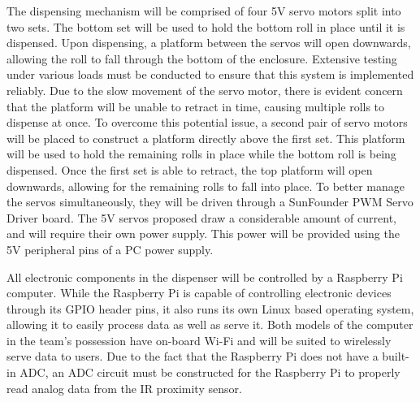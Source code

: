 \par The dispensing mechanism will be comprised of four 5V servo motors split into two sets. The bottom set will be used to hold the bottom roll in place until it is dispensed. Upon dispensing, a platform between the servos will open downwards, allowing the roll to fall through the bottom of the enclosure. Extensive testing under various loads must be conducted to ensure that this system is implemented reliably. Due to the slow movement of the servo motor, there is evident concern that the platform will be unable to retract in time, causing multiple rolls to dispense at once. To overcome this potential issue, a second pair of servo motors will be placed to construct a platform directly above the first set. This platform will be used to hold the remaining rolls in place while the bottom roll is being dispensed. Once the first set is able to retract, the top platform will open downwards, allowing for the remaining rolls to fall into place. To better manage the servos simultaneously, they will be driven through a SunFounder PWM Servo Driver board. The 5V servos proposed draw a considerable amount of current, and will require their own power supply. This power will be provided using the 5V peripheral pins of a PC power supply. 

\par All electronic components in the dispenser will be controlled by a Raspberry Pi computer. While the Raspberry Pi is capable of controlling electronic devices through its GPIO header pins, it also runs its own Linux based operating system, allowing it to easily process data as well as serve it. Both models of the computer in the team's possession have on-board Wi-Fi and will be suited to wirelessly serve data to users. Due to the fact that the Raspberry Pi does not have a built-in ADC, an ADC circuit must be constructed for the Raspberry Pi to properly read analog data from the IR proximity sensor. 

